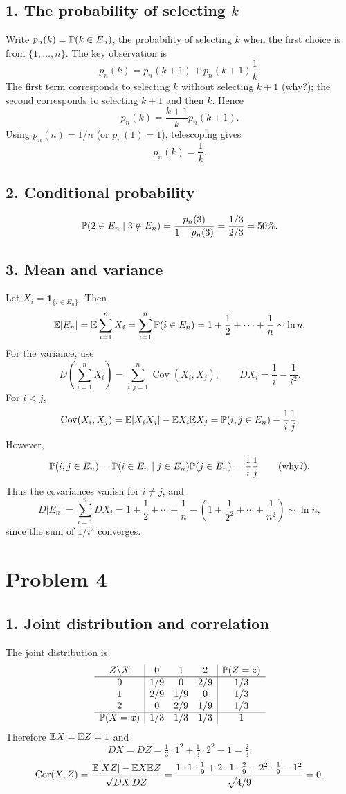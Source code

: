 \documentclass[11pt,a4paper]{article}
\begin{document}
\subsection*{1. The probability of selecting $k$}
Write $p_n(k)=\P(k\in E_n)$, the probability of selecting $k$ when the first choice is from $\{1,\ldots,n\}$. The key observation is
\[
p_n(k)=p_n(k+1)+p_n(k+1)\frac1k.
\]
The first term corresponds to selecting $k$ without selecting $k+1$ (why?); the second corresponds to selecting $k+1$ and then $k$. Hence
\[
p_n(k)=\frac{k+1}{k}p_n(k+1).
\]
Using $p_n(n)=1/n$ (or $p_n(1)=1$), telescoping gives
\[
p_n(k)=\frac1k.
\]

\subsection*{2. Conditional probability}
\[
\P(2\in E_n\mid3\notin E_n)
=\frac{p_n(3)}{1-p_n(3)}=\frac{1/3}{2/3}=50\%.
\]

\subsection*{3. Mean and variance}
Let $X_i=\mathbf1_{\{i\in E_n\}}$. Then
\[
\E|E_n|=\E\sum_{i=1}^nX_i
=\sum_{i=1}^n\P(i\in E_n)=1+\frac12+\cdots+\frac1n\sim\ln n.
\]
For the variance, use
\[
D\left(\sum_{i=1}^nX_i\right)=\sum_{i,j=1}^n\operatorname{Cov}(X_i,X_j),
\qquad DX_i=\frac1i-\frac1{i^2}.
\]
For $i<j$,
\[
\operatorname{Cov}(X_i,X_j)=\E[X_iX_j]-\E X_i\E X_j
=\P(i,j\in E_n)-\frac1i\frac1j.
\]
However,
\[
\P(i,j\in E_n)=\P(i\in E_n\mid j\in E_n)\P(j\in E_n)
=\frac1i\frac1j\qquad\text{(why?)}.
\]
Thus the covariances vanish for $i\ne j$, and
\[
D|E_n|=\sum_{i=1}^nDX_i
=1+\frac12+\cdots+\frac1n
-\left(1+\frac1{2^2}+\cdots+\frac1{n^2}\right)\sim\ln n,
\]
since the sum of $1/i^2$ converges.

\section*{Problem 4}
\subsection*{1. Joint distribution and correlation}
The joint distribution is
\[
\begin{array}{c|ccc|c}
Z\backslash X&0&1&2&\P(Z=z)\\\hline
0&1/9&0&2/9&1/3\\
1&2/9&1/9&0&1/3\\
2&0&2/9&1/9&1/3\\\hline
\P(X=x)&1/3&1/3&1/3&1
\end{array}
\]
Therefore $\E X=\E Z=1$ and
\[
DX=DZ=\tfrac13\cdot1^2+\tfrac13\cdot2^2-1=\tfrac23.
\]
\[
\operatorname{Cor}(X,Z)=\frac{\E[XZ]-\E X\E Z}{\sqrt{DX\,DZ}}
=\frac{1\cdot1\cdot\frac19+2\cdot1\cdot\frac29+2^2\cdot\frac19-1^2}
{\sqrt{4/9}}=0.
\]
\end{document}
